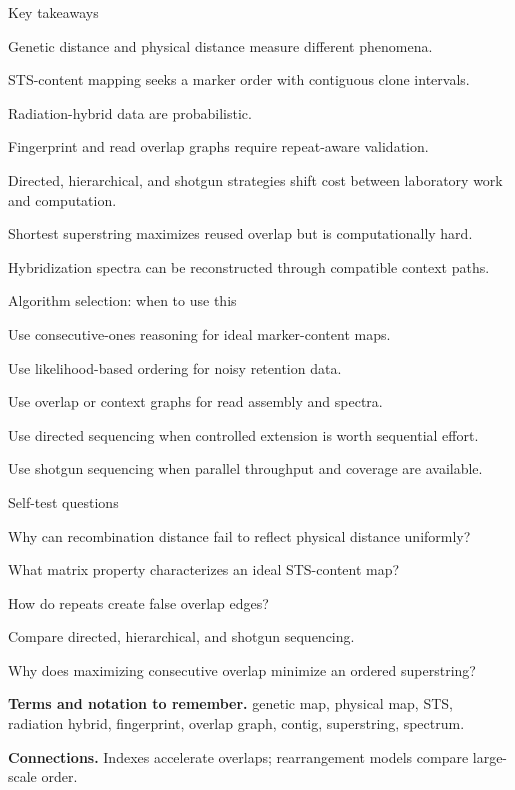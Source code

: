 \documentclass[11pt,letterpaper]{article}
\begin{document}
\begin{CornellSummaryBox}{Key takeaways}
\begin{CornellRecallList}
  \item Genetic distance and physical distance measure different phenomena.
  \item STS-content mapping seeks a marker order with contiguous clone intervals.
  \item Radiation-hybrid data are probabilistic.
  \item Fingerprint and read overlap graphs require repeat-aware validation.
  \item Directed, hierarchical, and shotgun strategies shift cost between laboratory work and computation.
  \item Shortest superstring maximizes reused overlap but is computationally hard.
  \item Hybridization spectra can be reconstructed through compatible context paths.
\end{CornellRecallList}
\end{CornellSummaryBox}

\begin{CornellOverviewBox}{Algorithm selection: when to use this}
\begin{CornellChecklist}
  \item Use consecutive-ones reasoning for ideal marker-content maps.
  \item Use likelihood-based ordering for noisy retention data.
  \item Use overlap or context graphs for read assembly and spectra.
  \item Use directed sequencing when controlled extension is worth sequential effort.
  \item Use shotgun sequencing when parallel throughput and coverage are available.
\end{CornellChecklist}
\end{CornellOverviewBox}

\begin{CornellExamBox}{Self-test questions}
\begin{CornellRecallList}
  \item Why can recombination distance fail to reflect physical distance uniformly?
  \item What matrix property characterizes an ideal STS-content map?
  \item How do repeats create false overlap edges?
  \item Compare directed, hierarchical, and shotgun sequencing.
  \item Why does maximizing consecutive overlap minimize an ordered superstring?
\end{CornellRecallList}
\end{CornellExamBox}

{\footnotesize
\textbf{Terms and notation to remember.} genetic map, physical map, STS, radiation hybrid, fingerprint, overlap graph, contig, superstring, spectrum.

\textbf{Connections.} Indexes accelerate overlaps; rearrangement models compare large-scale order.
}
\end{document}
